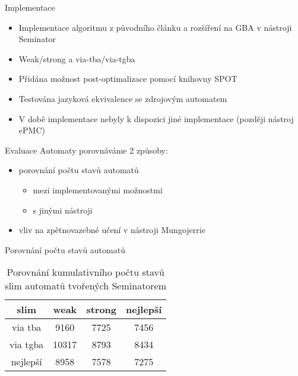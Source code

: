 \documentclass[
]{beamer}
\begin{document}
	\begin{frame}{Implementace}
		\begin{itemize}
			\pause
			\item Implementace algoritmu z původního článku a rozšíření na GBA v nástroji Seminator
			\pause
			\item Weak/strong a via-tba/via-tgba 
			\pause
			\item Přidána možnost post-optimalizace pomocí knihovny SPOT	
			\pause
			\item Testována jazyková ekvivalence se zdrojovým automatem
			\pause
			\item V době implementace nebyly k dispozici jiné implementace (později nástroj ePMC)
			
		\end{itemize}
	\end{frame}

	\begin{frame}{Evaluace}
		Automaty porovnáváme 2 způsoby:
		\pause
		\begin{itemize}
			\item porovnání počtu stavů automatů
			\begin{itemize}
				\item mezi implementovanými možnostmi
				\item s jinými nástroji
			\end{itemize}
			\pause
			\item vliv na zpětnovazebné učení v nástroji Mungojerrie
		\end{itemize}
	\end{frame}



	\begin{frame}{Porovnání počtu stavů automatů}
		\begin{table}[ht]
			\centering
			\caption{Porovnání kumulativního počtu stavů slim automatů tvořených Seminatorem}
	\begin{tabular}{ |c||c|c|c| } 		
		\hline
		
		slim&weak&\alert{strong}&nejlepší \\
		\hline
		\alert{via tba}&9160& \alert{7725} & 7456\\
		\hline
		via tgba&10317& 8793& 8434\\ 
		\hline
		nejlepší&8958& 7578& \alert{7275} \\ 
		\hline
	\end{tabular}
\end{table}
\end{frame}
\end{document}
